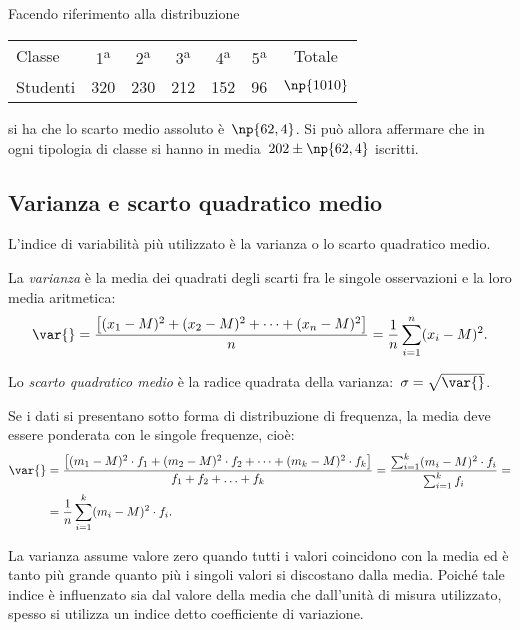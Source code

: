 Facendo riferimento alla distribuzione
\begin{center}
\begin{tabular}{lcccccc}
\toprule
 Classe & 1\textsuperscript{a} & 2\textsuperscript{a} & 3\textsuperscript{a} & 4\textsuperscript{a} & 5\textsuperscript{a} & Totale\\
 Studenti & 320 & 230 & 212 & 152 & 96 & $\np{1010}$ \\
\bottomrule
\end{tabular}
\end{center}
si ha che lo scarto medio assoluto è~$\np{62,4}$. Si può allora affermare che in ogni tipologia di classe si hanno in media~$202\pm\np{62,4}$ iscritti.

\subsection{Varianza e scarto quadratico medio}

L'indice di variabilità più utilizzato è la varianza o lo scarto quadratico medio.

\begin{definizione}
La \emph{varianza} è la media dei quadrati degli scarti fra le singole osservazioni e la loro media
aritmetica:
\[\var{}=\frac{ \left[ (x_1-M)^2+(x_2-M)^2+ \cdots +(x_n-M)^2 \right] }{n}=\frac{1}{n}\sum_{i=1}^n (x_i-M)^2.\]

Lo \emph{scarto quadratico medio} è la radice quadrata della varianza:~$\sigma=\sqrt{\var{}}$.
\end{definizione}

Se i dati si presentano sotto forma di distribuzione di frequenza, la media deve essere ponderata con le singole
frequenze, cioè:
\begin{equation*}
\begin{split}
\var{}&=\frac{\left[(m_1-M)^2\cdot f_1+(m_2-M)^2\cdot f_2+ \cdots +(m_k-M)^2\cdot f_k \right]}{f_1+f_2+\ldots+f_k}=\frac {\sum_{i=1}^k(m_i-M)^2\cdot f_i}{\sum_{i=1}^k f_i}=\\
&=\frac{1}{n}\sum_{i=1}^k(m_i-M)^2\cdot f_i.
\end{split}
\end{equation*}

La varianza assume valore zero quando tutti i valori coincidono con la media ed è tanto più grande quanto più i singoli valori
si discostano dalla media. Poiché tale indice è influenzato sia dal valore della media che dall'unità di misura utilizzato, spesso si utilizza
un indice detto coefficiente di variazione.

